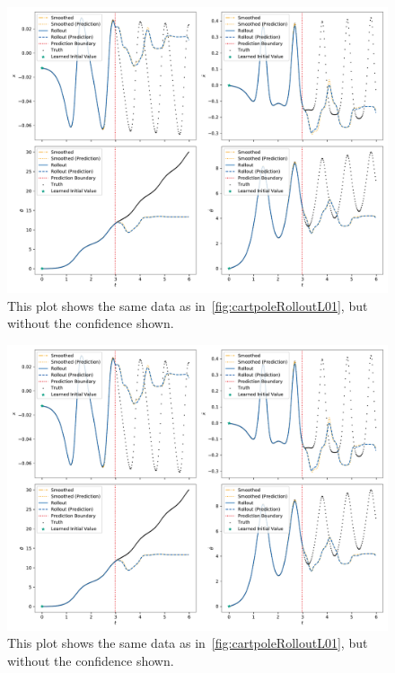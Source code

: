 			\begin{figure}
				\centering
				\includegraphics[width=\linewidth]{figures/results/cartpole-gym/run-latent-dim-31/without-confidence/rollout-observations-N0.pdf}
				\caption{This plot shows the same data as in~\autoref{fig:cartpoleRolloutL01}, but without the confidence shown.}
				\label{fig:cartpoleRolloutL10Appendix}
			\end{figure}

			\begin{figure}
				\centering
				\includegraphics[width=\linewidth]{figures/results/cartpole-gym/run-latent-dim-31/without-confidence/rollout-observations-N0.pdf}
				\caption{This plot shows the same data as in~\autoref{fig:cartpoleRolloutL01}, but without the confidence shown.}
				\label{fig:cartpoleRolloutL31Appendix}
			\end{figure}
